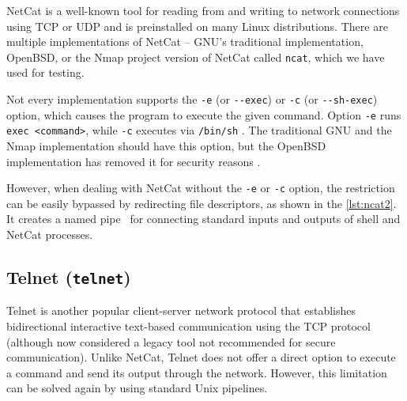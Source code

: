 NetCat is a well-known tool for reading from and writing to network connections using TCP or UDP and is preinstalled on many Linux distributions. There are multiple implementations of NetCat -- GNU's traditional implementation, OpenBSD, or the Nmap project version of NetCat called \texttt{ncat}, which we have used for testing.

Not every implementation supports the \texttt{-e} (or \texttt{-{}-exec}) or \texttt{-c} (or \texttt{-{}-sh-exec}) option, which causes the program to execute the given command. Option \texttt{-e} runs \texttt{exec <command>}, while \texttt{-c} executes via \texttt{/bin/sh} \cite{ncat-man}. The traditional GNU and the Nmap implementation should have this option, but the OpenBSD implementation has removed it for security reasons \cite{nc-man}.



However, when dealing with NetCat without the \texttt{-e} or \texttt{-c} option, the restriction can be easily bypassed by redirecting file descriptors, as shown in the \cref{lst:ncat2}. It creates a named pipe \tmp\ for connecting standard inputs and outputs of shell and NetCat processes.




\subsection{Telnet (\texttt{telnet})} \label{telnet}


Telnet is another popular client-server network protocol that establishes bidirectional interactive text-based communication using the TCP protocol (although now considered a legacy tool not recommended for secure communication). Unlike NetCat, Telnet does not offer a direct option to execute a command and send its output through the network. However, this limitation can be solved again by using standard Unix pipelines.

